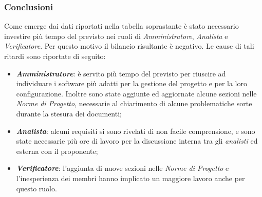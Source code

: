 \subsubsection{Conclusioni}
Come emerge dai dati riportati nella tabella soprastante è stato necessario investire più tempo del previsto nei ruoli di \textit{Amministratore}, \textit{Analista} e \textit{Verificatore}. Per questo motivo il bilancio risultante è negativo. Le cause di tali ritardi sono riportate di seguito:
\begin{itemize}
\item \textbf{\textit{Amministratore}}: è servito più tempo del previsto per riuscire ad individuare i software più adatti per la gestione del progetto e per la loro  configurazione. Inoltre sono state aggiunte ed aggiornate alcune sezioni nelle \textit{Norme di Progetto}, necessarie al chiarimento di alcune problematiche sorte durante la stesura dei documenti;
\item \textbf{\textit{Analista}}: alcuni requisiti si sono rivelati di non facile comprensione, e sono state necessarie più ore di lavoro per la discussione interna tra gli \textit{analisti} ed esterna con il proponente;
\item \textbf{\textit{Verificatore}}: l’aggiunta di nuove sezioni nelle \textit{Norme di Progetto} e l'inesperienza dei membri hanno implicato un maggiore lavoro anche per questo ruolo.
\end{itemize}